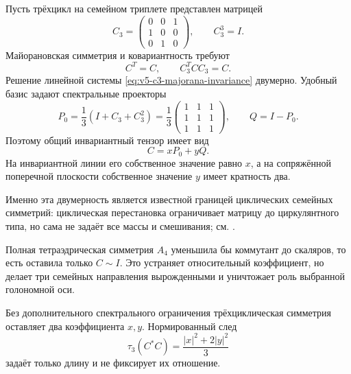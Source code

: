 Пусть трёхцикл на семейном триплете представлен матрицей
\begin{equation}
 C_3=
 \begin{pmatrix}
 0&0&1\\
 1&0&0\\
 0&1&0
 \end{pmatrix},
 \qquad C_3^3=I.
\end{equation}
Майорановская симметрия и ковариантность требуют
\begin{equation}
 C^T=C,
 \qquad
 C_3^T C C_3=C.
 \label{eq:v5-c3-majorana-invariance}
\end{equation}
Решение линейной системы \eqref{eq:v5-c3-majorana-invariance} двумерно.
Удобный базис задают спектральные проекторы
\begin{equation}
 P_0=\frac13(I+C_3+C_3^2)
 =\frac13
 \begin{pmatrix}
 1&1&1\\1&1&1\\1&1&1
 \end{pmatrix},
 \qquad Q=I-P_0.
 \label{eq:v5-c3-zero-projector}
\end{equation}
Поэтому общий инвариантный тензор имеет вид
\begin{equation}
 C=xP_0+yQ.
 \label{eq:v5-c3-majorana-family-tensor}
\end{equation}
На инвариантной линии его собственное значение равно $x$, а на
сопряжённой поперечной плоскости собственное значение $y$ имеет кратность
два.

Именно эта двумерность является известной границей циклических семейных
симметрий: циклическая перестановка ограничивает матрицу до циркулянтного
типа, но сама не задаёт все массы и смешивания; см.
.

Полная тетраэдрическая симметрия $A_4$ уменьшила бы коммутант до скаляров,
то есть оставила только $C\sim I$. Это устраняет относительный коэффициент,
но делает три семейных направления вырожденными и уничтожает роль
выбранной голономной оси.

\begin{nogocriterion}
Без дополнительного спектрального ограничения трёхциклическая симметрия
оставляет два коэффициента $x,y$. Нормированный след
\begin{equation}
 \tau_3(C^*C)=\frac{|x|^2+2|y|^2}{3}
\end{equation}
задаёт только длину и не фиксирует их отношение.
\end{nogocriterion}

